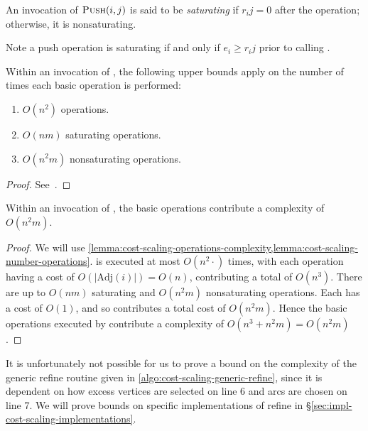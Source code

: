 \begin{defn}
An invocation of $\textproc{Push}(i,j)$ is said to be \emph{saturating} if $r_ij = 0$ after the operation; otherwise, it is nonsaturating.\\
\end{defn}

\begin{remark}
Note a push operation is saturating if and only if $e_i \geq r_ij$ prior to calling .\\
\end{remark}

\begin{lemma} \label{lemma:cost-scaling-number-operations}
Within an invocation of , the following upper bounds apply on the number of times each basic operation is performed:
\begin{enumerate}[label=(\alph*)]
    \item $O(n^2)$  operations.
    \item $O(nm)$ saturating  operations.
    \item $O(n^2m)$ nonsaturating  operations.
\end{enumerate}
\end{lemma}
\begin{proof}
See~\cite[lemma~6.3, lemma~6.4, lemma~6.7]{Goldberg:1987}.
\end{proof}

\begin{thm} \label{thm:cost-scaling-refine-complexity}
Within an invocation of , the basic operations contribute a complexity of $O(n^2m)$.
\end{thm}
\begin{proof}
We will use \cref{lemma:cost-scaling-operations-complexity,lemma:cost-scaling-number-operations}.  is executed at most $O(n^2\cdot)$ times, with each operation having a cost of $O\left(\left|\mathrm{Adj}(i)\right|\right) = O(n)$\footnotemark, contributing a total of $O(n^3)$. There are up to $O(nm)$ saturating and $O(n^2m)$ nonsaturating  operations. Each has a cost of $O(1)$, and so  contributes a total cost of $O(n^2m)$. Hence the basic operations executed by  contribute a complexity of $O(n^3 + n^2m) = O(n^2m)$.
\end{proof}

\begin{remark}
It is unfortunately not possible for us to prove a bound on the complexity of the generic refine routine given in \cref{algo:cost-scaling-generic-refine}, since it is dependent on how excess vertices are selected on line 6 and arcs are chosen on line 7. We will prove bounds on specific implementations of refine in \S\ref{sec:impl-cost-scaling-implementations}.\\
\end{remark}

